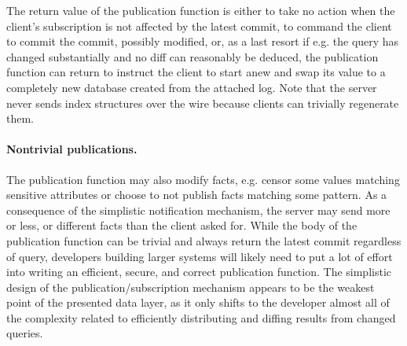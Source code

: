 \begin{center}
\end{center}

The return value of the publication function is either  to take no action when the client's subscription is not affected by the latest commit,  to command the client to commit the commit, possibly modified, or, as a last resort if e.g. the query has changed substantially and no diff can reasonably be deduced, the publication function can return  to instruct the client to start anew and swap its value to a completely new database created from the attached log. Note that the server never sends index structures over the wire because clients can trivially regenerate them.

\paragraph{Nontrivial publications.}
The publication function may also modify facts, e.g. censor some values matching sensitive attributes or choose to not publish facts matching some pattern. As a consequence of the simplistic notification mechanism, the server may send more or less, or different facts than the client asked for. While the body of the publication function can be trivial and always return the latest commit regardless of query, developers building larger systems will likely need to put a lot of effort into writing an efficient, secure, and correct publication function. The simplistic design of the publication/subscription mechanism appears to be the weakest point of the presented data layer, as it only shifts to the developer almost all of the complexity related to efficiently distributing and diffing results from changed queries.
